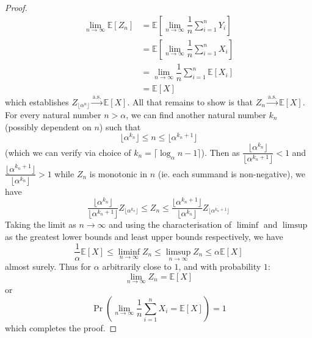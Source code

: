 \documentclass[11pt]{report} %
\begin{document}
\begin{proof}
\begin{align}
\lim_{n\to\infty}\mathbb{E}\left[Z_{n}\right] &= \mathbb{E}\left[\lim_{n\to\infty}\dfrac{1}{n}\sum_{i = 1}^{n}Y_{i}\right] \\
&= \mathbb{E}\left[\lim_{n\to\infty}\dfrac{1}{n}\sum_{i = 1}^{n}X_{i}\right] \\
&= \lim_{n\to\infty}\dfrac{1}{n}\sum_{i = 1}^{n}\mathbb{E}\left[X_{i}\right] \\
&= \mathbb{E}\left[X\right]
\end{align}
which establishes $Z_{\lfloor \alpha^{n} \rfloor} \overset{\mathrm{a.s.}}{\to} \mathbb{E}\left[X\right]$. All that remains to show is that $Z_{n} \overset{\mathrm{a.s.}}{\to} \mathbb{E}\left[X\right]$. For every natural number $n > \alpha$, we can find another natural number $k_{n}$ (possibly dependent on $n$) such that
\begin{equation}
\lfloor \alpha^{k_{n}} \rfloor \leq n \leq \lfloor \alpha^{k_{n} + 1} \rfloor
\end{equation}
(which we can verify via choice of $k_{n} = \lceil \log_{\alpha}n - 1\rceil$). Then as $\dfrac{\lfloor \alpha^{k_{n}} \rfloor}{\lfloor \alpha^{k_{n} + 1} \rfloor} < 1$ and $\dfrac{\lfloor \alpha^{k_{n} + 1} \rfloor}{\lfloor \alpha^{k_{n}} \rfloor} > 1$ while $Z_{n}$ is monotonic in $n$ (ie. each summand is non-negative), we have
\begin{equation}
\dfrac{\lfloor \alpha^{k_{n}} \rfloor}{\lfloor \alpha^{k_{n} + 1} \rfloor}Z_{\lfloor \alpha^{k_{n}} \rfloor} \leq Z_{n} \leq \dfrac{\lfloor \alpha^{k_{n} + 1}\rfloor}{\lfloor \alpha^{k_{n}} \rfloor}Z_{\lfloor \alpha^{k_{n} + 1} \rfloor} 
\end{equation}
Taking the limit as $n \to \infty$ and using the characterisation of $\liminf$ and $\limsup$ as the greatest lower bounds and least upper bounds respectively, we have
\begin{equation}
\dfrac{1}{\alpha}\mathbb{E}\left[X\right] \leq \liminf_{n\to\infty}Z_{n} \leq \limsup_{n\to\infty}Z_{n} \leq \alpha\mathbb{E}\left[X\right]
\end{equation}
almost surely. Thus for $\alpha$ arbitrarily close to $1$, and with probability $1$:
\begin{equation}
\lim_{n\to\infty}Z_{n} = \mathbb{E}\left[X\right]
\end{equation}
or
\begin{equation}
\operatorname{Pr}\left(\lim_{n\to\infty}\dfrac{1}{n}\sum_{i = 1}^{n}X_{i} = \mathbb{E}\left[X\right]\right) = 1
\end{equation}
which completes the proof.
\end{proof}
\end{document}
